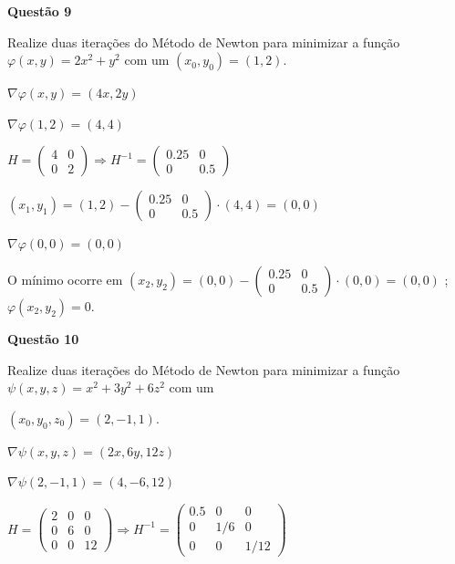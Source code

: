 \documentclass{rbfin}
\begin{document}
\large

\textbf{Questão 9}

\normalsize

\vspace{6mm}

\doublespacing

Realize duas iterações do Método de Newton para minimizar a função $\varphi(x, y) = 2 x^2 + y^2$ com um $(x_0, y_0) = (1, 2)$.

$\nabla \varphi(x,y) = (4x, 2y)$

$\nabla \varphi(1, 2) = (4, 4)$

$H = \begin{pmatrix} 4 & 0 \\ 0 & 2 \end{pmatrix} \Rightarrow H^{-1} = \begin{pmatrix} 0.25 & 0 \\ 0 & 0.5 \end{pmatrix}$

$(x_1, y_1) = (1, 2) - \begin{pmatrix} 0.25 & 0 \\ 0 & 0.5 \end{pmatrix} \cdot (4, 4) = (0 , 0)$

$\nabla \varphi(0, 0) = (0, 0)$

O mínimo ocorre em $(x_2, y_2) = (0, 0) - \begin{pmatrix} 0.25 & 0 \\ 0 & 0.5 \end{pmatrix} \cdot (0, 0) = (0, 0)$ ; $\varphi(x_2, y_2) = 0$.

\singlespacing

\vspace{6mm}

\large

\textbf{Questão 10}

\normalsize

\vspace{6mm}

\doublespacing

Realize duas iterações do Método de Newton para minimizar a função $\psi(x, y, z) = x^2 + 3 y^2 + 6 z^2$ com um 

$(x_0, y_0, z_0) = (2, -1, 1)$.

$\nabla \psi(x,y,z) = (2x, 6y, 12z)$

$\nabla \psi(2, -1, 1) = (4, -6, 12)$

$H = \begin{pmatrix} 2 & 0 & 0 \\ 0 & 6 & 0 \\ 0 & 0 & 12 \end{pmatrix} \Rightarrow H^{-1} = \begin{pmatrix} 0.5 & 0 & 0 \\ 0 & 1/6 & 0 \\ 0 & 0 & 1/12 \end{pmatrix}$
\end{document}
